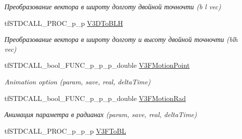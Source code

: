 \begin{DoxyCompactItemize}
\begin{DoxyCompactList}\small\item\em Преобразование вектора в широту долготу двойной точночти (b l vec) \end{DoxyCompactList}\item 
\hypertarget{structs_functions_extension_c_p_u_a4c1067069c6669de5dd36d9a27427a0c}{tf\-S\-T\-D\-C\-A\-L\-L\-\_\-\-P\-R\-O\-C\-\_\-p\-\_\-p \hyperlink{structs_functions_extension_c_p_u_a4c1067069c6669de5dd36d9a27427a0c}{V3\-D\-To\-B\-L\-H}}\label{structs_functions_extension_c_p_u_a4c1067069c6669de5dd36d9a27427a0c}

\begin{DoxyCompactList}\small\item\em Преобразование вектора в широту долготу и высоту двойной точночти (blh vec) \end{DoxyCompactList}\item 
\hypertarget{structs_functions_extension_c_p_u_a2b250c8e8234d6e48e7eaa546ed7d0dd}{tf\-S\-T\-D\-C\-A\-L\-L\-\_\-bool\-\_\-\-F\-U\-N\-C\-\_\-p\-\_\-p\-\_\-p\-\_\-double \hyperlink{structs_functions_extension_c_p_u_a2b250c8e8234d6e48e7eaa546ed7d0dd}{V3\-F\-Motion\-Point}}\label{structs_functions_extension_c_p_u_a2b250c8e8234d6e48e7eaa546ed7d0dd}

\begin{DoxyCompactList}\small\item\em Animation option (param, save, real, delta\-Time) \end{DoxyCompactList}\item 
\hypertarget{structs_functions_extension_c_p_u_a14777d6bd93d52fea98f3b090bcb3d22}{tf\-S\-T\-D\-C\-A\-L\-L\-\_\-bool\-\_\-\-F\-U\-N\-C\-\_\-p\-\_\-p\-\_\-p\-\_\-double \hyperlink{structs_functions_extension_c_p_u_a14777d6bd93d52fea98f3b090bcb3d22}{V3\-F\-Motion\-Rad}}\label{structs_functions_extension_c_p_u_a14777d6bd93d52fea98f3b090bcb3d22}

\begin{DoxyCompactList}\small\item\em Анимация параметра в радианах (param, save, real, delta\-Time) \end{DoxyCompactList}\item 
\hypertarget{structs_functions_extension_c_p_u_ab901cef4e15da2d4eb22694a92cba1b3}{tf\-S\-T\-D\-C\-A\-L\-L\-\_\-\-P\-R\-O\-C\-\_\-p\-\_\-p\-\_\-p \hyperlink{structs_functions_extension_c_p_u_ab901cef4e15da2d4eb22694a92cba1b3}{V3\-F\-To\-B\-L}}\label{structs_functions_extension_c_p_u_ab901cef4e15da2d4eb22694a92cba1b3}


\end{DoxyCompactItemize}
